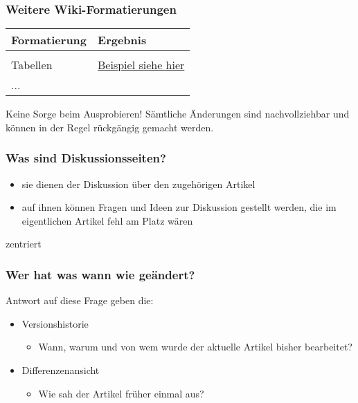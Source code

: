 \documentclass{beamer}
\begin{document}
\begin{frame}
  \frametitle{Weitere Wiki-Formatierungen}
  \begin{longtable}{|l|l|}
    \hline
    \textbf{Formatierung                                                      } & \textbf{Ergebnis                       } \\ 
    \hline
     
     \\ 

    \hline
     
    Tabellen                                                            & \href{https://de.wikipedia.org/wiki/Hilfe:Tabellen}{Beispiel siehe hier} \\ 
    \hline
     
    \multicolumn{2}{|l|}{...} \\ 
    \hline
     
  \end{longtable}

Keine Sorge beim Ausprobieren! Sämtliche Änderungen sind nachvollziehbar und können in der Regel rückgängig gemacht werden.
\end{frame}


\begin{frame}
  \frametitle{Was sind Diskussionsseiten?}

  \begin{itemize}
    \item sie dienen der Diskussion über den zugehörigen Artikel
    \item auf ihnen können Fragen und Ideen zur Diskussion gestellt werden,
      die im eigentlichen Artikel fehl am Platz wären
  \end{itemize}


  zentriert
\end{frame}


\begin{frame}
  \frametitle{Wer hat was wann wie geändert?}

  Antwort auf diese Frage geben die:
  \begin{itemize}
    \item Versionshistorie

    \begin{itemize}
      \item Wann, warum und von wem wurde der aktuelle Artikel bisher bearbeitet?
    \end{itemize}
    \item Differenzenansicht

    \begin{itemize}
      \item Wie sah der Artikel früher einmal aus?
    \end{itemize}
  \end{itemize}
\end{frame}
\end{document}
